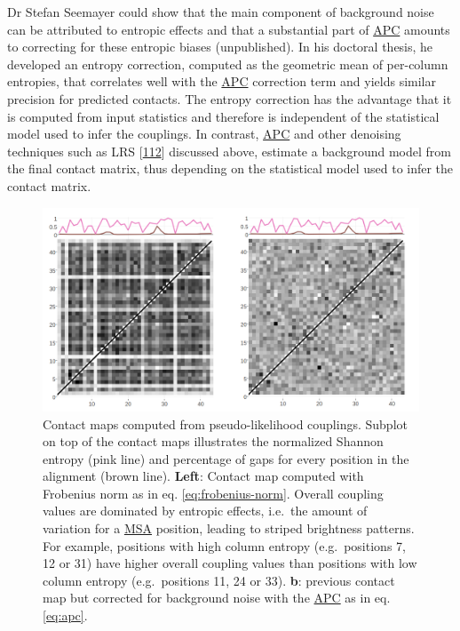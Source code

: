 \documentclass[11pt,a4paper,twoside]{book}
\theoremstyle{definition}
\theoremstyle{definition}
\theoremstyle{remark}
\begin{document}
Dr Stefan Seemayer could show that the main component of background
noise can be attributed to entropic effects and that a substantial part
of \protect\hyperlink{abbrev}{APC} amounts to correcting for these
entropic biases (unpublished). In his doctoral thesis, he developed an
entropy correction, computed as the geometric mean of per-column
entropies, that correlates well with the \protect\hyperlink{abbrev}{APC}
correction term and yields similar precision for predicted contacts. The
entropy correction has the advantage that it is computed from input
statistics and therefore is independent of the statistical model used to
infer the couplings. In contrast, \protect\hyperlink{abbrev}{APC} and
other denoising techniques such as LRS
{[}\protect\hyperlink{ref-Zhang2016}{112}{]} discussed above, estimate a
background model from the final contact matrix, thus depending on the
statistical model used to infer the contact matrix.















\begin{figure}

{\centering \includegraphics[width=0.9\linewidth]{img/intro/apc_correction_with_entropy} 

}

\caption{Contact maps computed from
pseudo-likelihood couplings. Subplot on top of the contact maps
illustrates the normalized Shannon entropy ({pink } line) and percentage
of gaps for every position in the alignment ({brown } line).
\textbf{Left}: Contact map computed with Frobenius norm as in eq.
\eqref{eq:frobenius-norm}. Overall coupling values are dominated by
entropic effects, i.e.~the amount of variation for a
\protect\hyperlink{abbrev}{MSA} position, leading to striped brightness
patterns. For example, positions with high column entropy
(e.g.~positions 7, 12 or 31) have higher overall coupling values than
positions with low column entropy (e.g.~positions 11, 24 or 33).
\textbf{b}: previous contact map but corrected for background noise with
the \protect\hyperlink{abbrev}{APC} as in eq. \eqref{eq:apc}.}\label{fig:apc-correction}
\end{figure}
\end{document}
